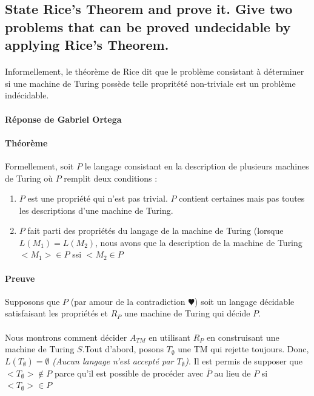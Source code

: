 \subsection{State Rice’s Theorem and prove it. Give two problems that can be proved undecidable by applying Rice’s Theorem. }

\paragraph{} Informellement, le théorème de Rice dit que le problème consistant à déterminer si une machine de Turing possède telle propritété non-triviale est un problème indécidable.

\paragraph{Réponse de Gabriel Ortega}
\paragraph{Théorème} Formellement, soit $P$ le langage consistant en la description de plusieurs machines de Turing où $P$ remplit deux conditions :
\begin{enumerate}
  \item $P$ est une propriété qui n'est pas trivial. $P$ contient certaines mais pas toutes les descriptions d'une machine de Turing.
  \item $P$ fait parti des propriétés du langage de la machine de Turing (lorsque $L(M_{1}) = L(M_{2})$, nous avons que la description de la machine de Turing $<M_{1}> \in P$ ssi $<M_{2} \in P$
\end{enumerate}


\paragraph{Preuve} Supposons que $P$ (par amour de la contradiction $\varheart$) soit un langage décidable satisfaisant les propriétés et $R_{P}$ une machine de Turing qui décide $P$.

\paragraph{}
Nous montrons comment décider $A_{TM}$ en utilisant $R_{P}$ en construisant une machine de Turing $S$.Tout d'abord, posons $T_{\emptyset}$ une TM qui rejette toujours. Donc, $L(T_{\emptyset}) = \emptyset$ \textit{(Aucun langage n'est accepté par $T_{\emptyset}$)}. Il est permis de supposer que $<T_{\emptyset}> \not\in P$ parce qu'il est possible de procéder avec $\overline{P}$ au lieu de $P$ si $<T_{\emptyset}> \in P$ 

